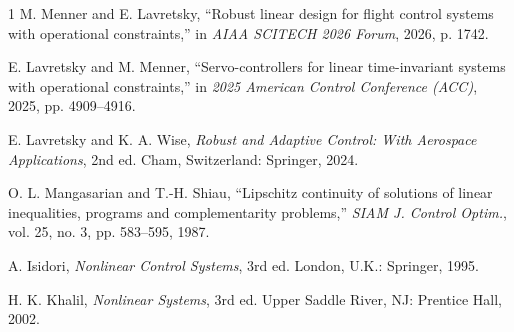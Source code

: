 \documentclass[lettersize,journal]{IEEEtran}
\begin{document}
\begin{thebibliography}{1}
M. Menner and E. Lavretsky, ``Robust linear design for flight control systems with operational constraints,'' in \emph{AIAA SCITECH 2026 Forum}, 2026, p. 1742.

E. Lavretsky and M. Menner, ``Servo-controllers for linear time-invariant systems with operational constraints,'' in \emph{2025 American Control Conference (ACC)}, 2025, pp. 4909--4916.

E. Lavretsky and K. A. Wise, \emph{Robust and Adaptive Control: With Aerospace Applications}, 2nd ed. Cham, Switzerland: Springer, 2024.

O. L. Mangasarian and T.-H. Shiau, ``Lipschitz continuity of solutions of linear inequalities, programs and complementarity problems,'' \emph{SIAM J. Control Optim.}, vol. 25, no. 3, pp. 583--595, 1987.

A. Isidori, \emph{Nonlinear Control Systems}, 3rd ed. London, U.K.: Springer, 1995.

H. K. Khalil, \emph{Nonlinear Systems}, 3rd ed. Upper Saddle River, NJ: Prentice Hall, 2002.
\end{thebibliography}
\end{document}
